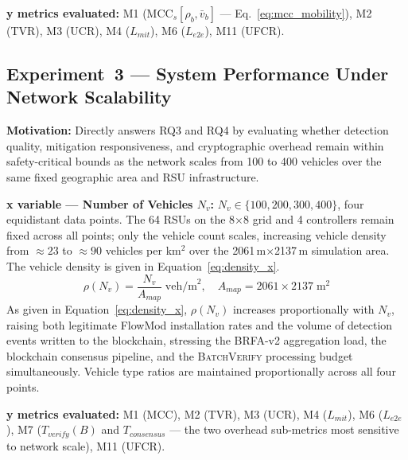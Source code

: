 \documentclass[12pt, a4paper]{report}
\begin{document}
{{\textbf{y metrics evaluated:}
M1 ($\text{MCC}_s[\rho_b, \bar{v}_b]$ —
Eq.~\ref{eq:mcc_mobility}), M2 (TVR), M3 (UCR),
M4 ($L_{mit}$), M6 ($L_{e2e}$), M11 (UFCR).



\subsection{Experiment~3 — System Performance Under
Network Scalability}
\label{sec:exp3}

\textbf{Motivation:} Directly answers RQ3 and RQ4
by evaluating whether detection quality, mitigation
responsiveness, and cryptographic overhead remain
within safety-critical bounds as the network scales
from 100 to 400 vehicles over the same fixed
geographic area and \ac{RSU} infrastructure.

\textbf{x variable — Number of Vehicles $N_v$:}
$N_v \in \{100, 200, 300, 400\}$, four equidistant
data points. The 64 \ac{RSU}s on the 8$\times$8
grid and 4 controllers remain fixed across all
points; only the vehicle count scales, increasing
vehicle density from $\approx 23$ to $\approx 90$
vehicles per km$^2$ over the
2061\,m$\times$2137\,m simulation area.
The vehicle density is given in
Equation~\eqref{eq:density_x}.
\begin{equation}
\rho(N_v) =
\frac{N_v}{A_{map}}
\;\text{veh/m}^2,
\quad A_{map} = 2061 \times 2137\;\text{m}^2
\label{eq:density_x}
\end{equation}
As given in Equation~\eqref{eq:density_x},
$\rho(N_v)$ increases proportionally with $N_v$,
raising both legitimate FlowMod installation rates
and the volume of detection events written to the
blockchain, stressing the BRFA-v2 aggregation load,
the blockchain consensus pipeline, and the
\textsc{BatchVerify} processing budget simultaneously.
Vehicle type ratios are maintained proportionally
across all four points.

\textbf{y metrics evaluated:}
M1 (MCC), M2 (TVR), M3 (UCR), M4 ($L_{mit}$),
M6 ($L_{e2e}$), M7 ($T_{verify}(B)$ and
$T_{consensus}$ — the two overhead sub-metrics
most sensitive to network scale), M11 (UFCR).



}}
\end{document}
